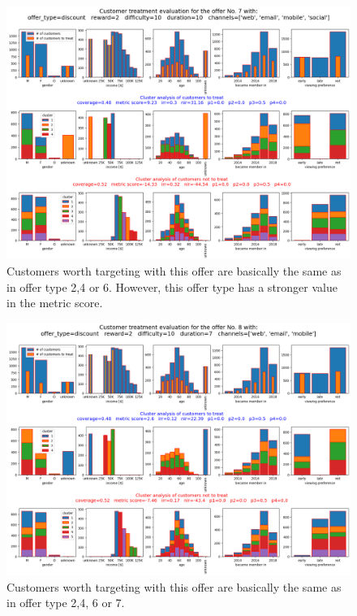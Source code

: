 \documentclass[11pt]{article} %
\begin{document}
\begin{figure}[H]
\includegraphics[height=0.5\textheight]{results/results7.png}
\caption{Customers worth targeting with this offer are basically the same as in offer type 2,4 or 6. However, this offer type has a stronger value in the metric score.}
\end{figure}
\begin{figure}[H]
\includegraphics[height=0.5\textheight]{results/results8.png}
\caption{Customers worth targeting with this offer are basically the same as in offer type 2,4, 6 or 7.}
\end{figure}
\end{document}
